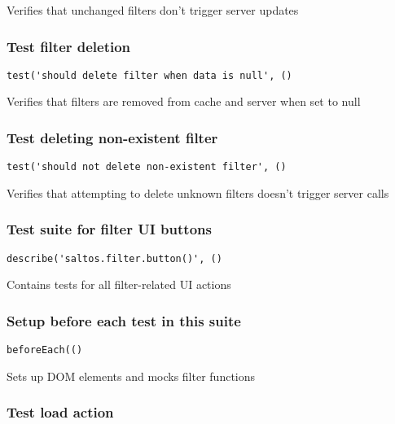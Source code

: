 \documentclass[a4paper]{article}
\begin{document}
Verifies that unchanged filters don't trigger server updates

\hypertarget{toc599}{}
\subsubsection{Test filter deletion}

\begin{lstlisting}
test('should delete filter when data is null', ()
\end{lstlisting}

Verifies that filters are removed from cache and server when set to null

\hypertarget{toc600}{}
\subsubsection{Test deleting non-existent filter}

\begin{lstlisting}
test('should not delete non-existent filter', ()
\end{lstlisting}

Verifies that attempting to delete unknown filters doesn't trigger server calls

\hypertarget{toc601}{}
\subsubsection{Test suite for filter UI buttons}

\begin{lstlisting}
describe('saltos.filter.button()', ()
\end{lstlisting}

Contains tests for all filter-related UI actions

\hypertarget{toc602}{}
\subsubsection{Setup before each test in this suite}

\begin{lstlisting}
beforeEach(()
\end{lstlisting}

Sets up DOM elements and mocks filter functions

\hypertarget{toc603}{}
\subsubsection{Test load action}
\end{document}
